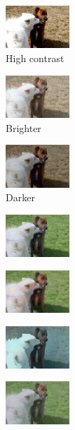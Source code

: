 \begin{figure}[t]
\begin{subfigure}[b]{0.1\textwidth}
			\includegraphics[width=2.4cm]{orig - filter - man contr (1).jpg}
			\caption{High contrast}
		\end{subfigure}
		\hfill
		\begin{subfigure}[b]{0.1\textwidth}
			\includegraphics[width=2.4cm]{orig - filter - lumin (1).jpeg}
			\caption{Brighter}
		\end{subfigure}
		\hfill
		\begin{subfigure}[b]{0.1\textwidth}
			\includegraphics[width=2.4cm]{orig - filter - lumin (2).jpeg}
			\caption{Darker}
		\end{subfigure}
	
				\begin{subfigure}[b]{0.1\textwidth}
			\centering
			\includegraphics[width=2.4cm]{c - filter.jpeg}

		\end{subfigure}
		\hfill
		\begin{subfigure}[b]{0.1\textwidth}
			\includegraphics[width=2.4cm]{c - filter - blurr.jpeg}
		\end{subfigure}
		\hfill
		\begin{subfigure}[b]{0.1\textwidth}
			\includegraphics[width=2.4cm]{c - filter - cartoon.jpeg}
		
		\end{subfigure}
		\hfill
		\begin{subfigure}[b]{0.1\textwidth}
			\includegraphics[width=2.4cm]{c - filter - man contr (1).jpg}
	

\end{subfigure}
\end{figure}
